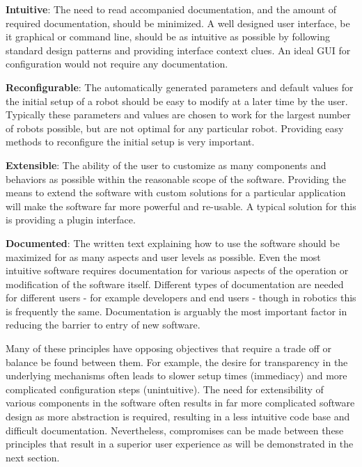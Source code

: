 \documentclass[10pt,journal,compsoc]{joser1}
\begin{document}
{{\bf Intuitive}: The need to read accompanied documentation, and the amount of required documentation, should be minimized. A well designed user interface, be it graphical or command line, should be as intuitive as possible by following standard design patterns and providing interface context clues. An ideal GUI for configuration would not require any documentation.

{\bf Reconfigurable}: The automatically generated parameters and default values for the initial setup of a robot should be easy to modify at a later time by the user. Typically these parameters and values are chosen to work for the largest number of robots possible, but are not optimal for any particular robot. Providing easy methods to reconfigure the initial setup is very important. 

{\bf Extensible}: The ability of the user to customize as many components and behaviors as possible within the reasonable scope of the software. Providing the means to extend the software with custom solutions for a particular application will make the software far more powerful and re-usable. A typical solution for this is providing a plugin interface.

{\bf Documented}: The written text explaining how to use the software should be maximized for as many aspects and user levels as possible. Even the most intuitive software requires documentation for various aspects of the operation or modification of the software itself. Different types of documentation are needed for different users - for example developers and end users - though in robotics this is frequently the same. Documentation is arguably the most important factor in reducing the barrier to entry of new software.

Many of these principles have opposing objectives that require a trade off or balance be found between them. For example, the desire for transparency in the underlying mechanisms often leads to slower setup times (immediacy) and more complicated configuration steps (unintuitive). The need for extensibility of various components in the software often results in far more complicated software design as more abstraction is required, resulting in a less intuitive code base and difficult documentation. Nevertheless, compromises can be made between these principles that result in a superior user experience as will be demonstrated in the next section.

}
\end{document}

